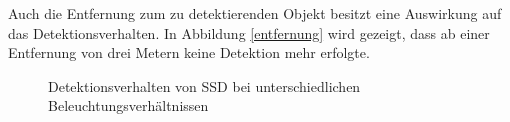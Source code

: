 Auch die Entfernung zum zu detektierenden Objekt besitzt eine Auswirkung auf das Detektionsverhalten. In Abbildung \ref{entfernung} wird gezeigt, dass ab einer Entfernung von drei Metern keine Detektion mehr erfolgte. 

\begin{figure}[H]
	\hfill
	\hfill
	\hfill
	\caption{Detektionsverhalten von SSD bei unterschiedlichen Beleuchtungsverhältnissen}
	\label{sicht}
\end{figure}

